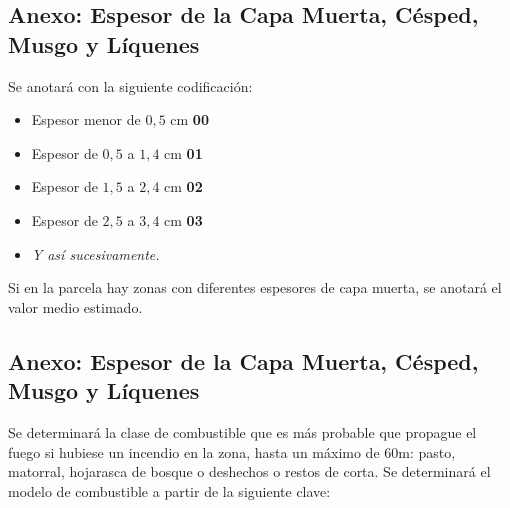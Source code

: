 \subsection{Anexo: Espesor de la Capa Muerta, Césped, Musgo y Líquenes}\label{sec:EspMue}

Se anotará con la siguiente codificación:

\begin{itemize}
    \item Espesor menor de $0,5$ cm \hfill \textbf{00}
    \item Espesor de $0,5$ a $1,4$ cm \hfill \textbf{01}
    \item Espesor de $1,5$ a $2,4$ cm \hfill \textbf{02}
    \item Espesor de $2,5$ a $3,4$ cm \hfill \textbf{03}
    \item \textit{Y así sucesivamente.}
\end{itemize}

\vspace{1em}
\noindent
Si en la parcela hay zonas con diferentes espesores de capa muerta, se anotará el valor medio estimado.

\subsection{Anexo: Espesor de la Capa Muerta, Césped, Musgo y Líquenes}\label{sec:modComb}
Se determinará la clase de combustible que es más probable que propague el fuego si hubiese un incendio en la zona, hasta un máximo de 60m: pasto, matorral, hojarasca de bosque o deshechos o restos de corta. Se determinará el modelo de combustible a partir de la siguiente clave:

